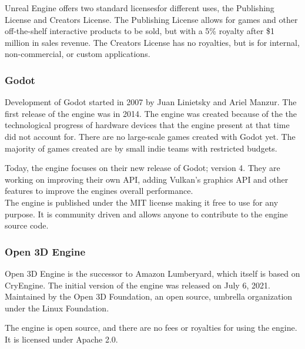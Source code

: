 Unreal Engine offers two standard licenses\footnotemark[2] for different uses, the Publishing License and Creators License. The Publishing License allows for games and other off-the-shelf interactive products to be sold, but with a 5\% royalty after \$1 million in sales revenue. The Creators License has no royalties, but is for internal, non-commercial, or custom applications. \cite{unreal_licence}



\subsubsection{Godot}
Development of Godot started in 2007 by Juan Linietsky and Ariel Manzur. The first release of the engine was in 2014. The engine was created because of the the technological progress of hardware devices that the engine present at that time did not account for. \cite{waiting_for_vr_2016} There are no large-scale games created with Godot yet. The majority of games created are by small indie teams with restricted budgets.

Today, the engine focuses on their new release of Godot; version 4. They are working on improving their own API, adding Vulkan's graphics API and other features to improve the engines overall performance. \cite{godot_improvements_verschelde_2022} \\

The engine is published under the MIT license making it free to use for any purpose. \cite{godot:licence} It is community driven and allows anyone to contribute to the engine source code. \cite{godot_introduction}


\subsubsection{Open 3D Engine}

Open 3D Engine is the successor to Amazon Lumberyard, which itself is based on CryEngine. The initial version of the engine was released on July 6, 2021. Maintained by the Open 3D Foundation, an open source, umbrella organization under the Linux Foundation. \cite{open3d_foundation} 

The engine is open source, and there are no fees or royalties for using the engine. It is licensed under Apache 2.0. \cite{open3d_licence}

